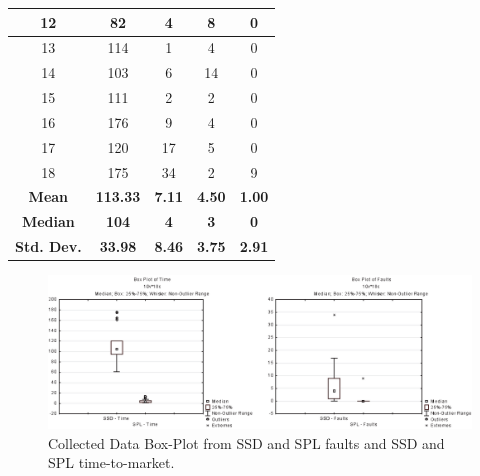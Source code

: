 \begin{table}
\begin{tabular}{c|c|c|c|c}
12                                  & 82              & 4               & 8              & 0                                              \\ \hline
13                                  & 114             & 1               & 4              & 0                                             \\ \hline
14                                  & 103             & 6               & 14             & 0                                            \\ \hline
15                                  & 111             & 2               & 2              & 0                                              \\ \hline
16                                  & 176             & 9               & 4              & 0                                              \\ \hline
17                                  & 120             & 17              & 5              & 0                                             \\ \hline
18                                  & 175             & 34              & 2              & 9                                              \\ \hline
\textbf{Mean}                       & \textbf{113.33} & \textbf{7.11}   & \textbf{4.50}  & \textbf{1.00}                 \\ \cline{1-5}
\textbf{Median}                     & \textbf{104}    & \textbf{4}      & \textbf{3}     & \textbf{0}                                      \\ \cline{1-5}
\textbf{Std. Dev.}                  & \textbf{33.98}  & \textbf{8.46}   & \textbf{3.75}  & \textbf{2.91}                             \\ \hline
\end{tabular}
\end{table}


\begin{figure}
\centering
\includegraphics[scale=0.8]{./figures/section4/boxplot.eps}
\centering
\caption{Collected Data Box-Plot from SSD and SPL faults and SSD and SPL time-to-market.}
\label{fig:boxplot}
\end{figure}

